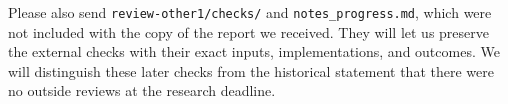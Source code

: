 \begin{enumerate}
  Please also send \nolinkurl{review-other1/checks/} and
  \nolinkurl{notes_progress.md}, which were not included with the copy
  of the report we received. They will let us preserve the external
  checks with their exact inputs, implementations, and outcomes. We will
  distinguish these later checks from the historical statement that
  there were no outside reviews at the research deadline.
\end{enumerate}
